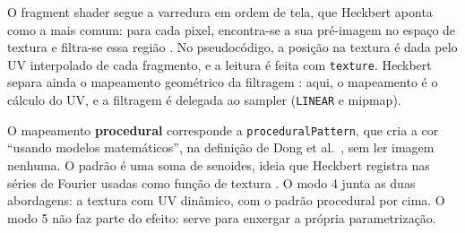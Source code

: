 O fragment shader segue a varredura em ordem de tela, que Heckbert aponta como a mais comum: para cada pixel, encontra-se a sua pré-imagem no espaço de textura e filtra-se essa região \cite[p.~3]{heckbert1986}. No pseudocódigo, a posição na textura é dada pelo UV interpolado de cada fragmento, e a leitura é feita com \texttt{texture}. Heckbert separa ainda o mapeamento geométrico da filtragem \cite[p.~1]{heckbert1986}: aqui, o mapeamento é o cálculo do UV, e a filtragem é delegada ao sampler (\texttt{LINEAR} e mipmap).

O mapeamento \textbf{procedural} corresponde a \texttt{proceduralPattern}, que cria a cor ``usando modelos matemáticos'', na definição de Dong et al.\ \cite[p.~1]{dong2020}, sem ler imagem nenhuma. O padrão é uma soma de senoides, ideia que Heckbert registra nas séries de Fourier usadas como função de textura \cite[p.~10]{heckbert1986}. O modo 4 junta as duas abordagens: a textura com UV dinâmico, com o padrão procedural por cima. O modo 5 não faz parte do efeito: serve para enxergar a própria parametrização.
